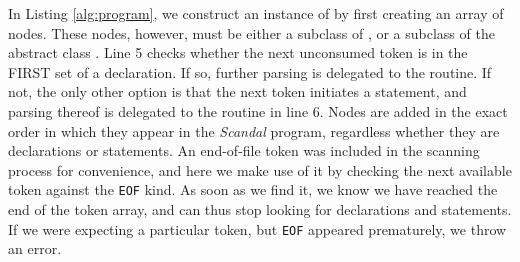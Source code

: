 In Listing \ref{alg:program}, we construct an instance of  by first creating an array of nodes. These nodes, however, must be either a subclass of , or a subclass of the abstract class . Line 5 checks whether the next unconsumed token is in the FIRST set of a declaration. If so, further parsing is delegated to the  routine. If not, the only other option is that the next token initiates a statement, and parsing thereof is delegated to the  routine in line 6. Nodes are added in the exact order in which they appear in the \emph{Scandal} program, regardless whether they are declarations or statements. An end-of-file token was included in the scanning process for convenience, and here we make use of it by checking the next available token against the \texttt{EOF} kind. As soon as we find it, we know we have reached the end of the token array, and can thus stop looking for declarations and statements. If we were expecting a particular token, but \texttt{EOF} appeared prematurely, we throw an error.

